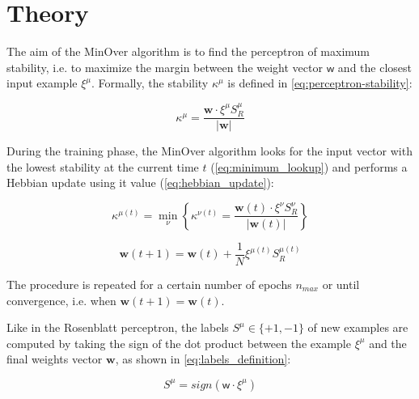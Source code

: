 \section{Theory}
\label{sec:theory}

The aim of the MinOver algorithm is to find the perceptron of maximum stability, i.e. to maximize the margin between the weight vector $\bm{\mathsf{w}}$ and the closest input example $\xi^\mu$. Formally, the stability $\kappa^\mu$ is defined in \cref{eq:perceptron-stability}:

\begin{equation}
    \kappa^\mu = \frac{\mathsf{\bm{w}} \cdotp \xi^\mu S^\mu_R}{\lvert \mathsf{\bm{w}} \rvert}
    \label{eq:perceptron-stability}
\end{equation}

During the training phase, the MinOver algorithm looks for the input vector with the lowest stability at the current time $t$ (\cref{eq:minimum_lookup}) and performs a Hebbian update using it value (\cref{eq:hebbian_update}):

\begin{equation}
    \kappa^{\mu(t)} = \min_\nu \left \{ \kappa^{\nu(t)} =  \frac{\mathsf{\bm{w}}(t) \cdotp \xi^\nu S^\nu_R}{\lvert \mathsf{\bm{w}}(t) \rvert} \right \}
    \label{eq:minimum_lookup}
\end{equation}

\begin{equation}
    \mathsf{\bm{w}}(t+1) = \mathsf{\bm{w}}(t) + \frac{1}{N} \xi^{\mu(t)} S^{\mu(t)}_R
    \label{eq:hebbian_update}
\end{equation}

The procedure is repeated for a certain number of epochs $n_{max}$ or until convergence, i.e. when $\mathsf{\bm{w}}(t+1) = \mathsf{\bm{w}}(t)$.

Like in the Rosenblatt perceptron, the labels $S^\mu \in \{+1, -1\}$ of new examples are computed by taking the sign of the dot product between the example $\xi^\mu$ and the final weights vector $\mathsf{\bm{w}}$, as shown in \cref{eq:labels_definition}:

\begin{equation}
    S^\mu = sign(\mathsf{w} \cdotp \xi^\mu)
    \label{eq:labels_definition}
\end{equation}
